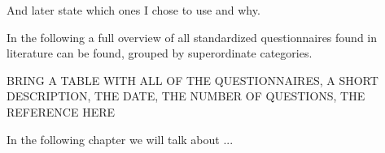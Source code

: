 And later state which ones I chose to use and why.

	In the following a full overview of all standardized questionnaires found in literature can be found, grouped by superordinate categories.

	BRING A TABLE WITH ALL OF THE QUESTIONNAIRES, A SHORT DESCRIPTION, THE DATE, THE NUMBER OF QUESTIONS, THE REFERENCE HERE


In the following chapter we will talk about ...
